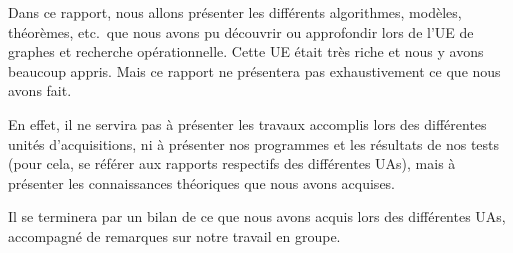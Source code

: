 
Dans ce rapport, nous allons présenter les différents algorithmes, modèles,
théorèmes, etc.\  que nous avons pu découvrir ou approfondir lors de l'UE de
graphes et recherche opérationnelle. Cette UE était très riche et nous y avons
beaucoup appris. Mais ce rapport ne présentera pas exhaustivement ce que nous
avons fait.

En effet, il ne servira pas à présenter les travaux accomplis lors des
différentes unités d'acquisitions, ni à présenter nos programmes et les
résultats de nos tests (pour cela, se référer aux rapports respectifs des
différentes UAs), mais à présenter les connaissances théoriques que nous avons
acquises.

Il se terminera par un bilan de ce que nous avons acquis lors des différentes
UAs, accompagné de remarques sur notre travail en groupe.
